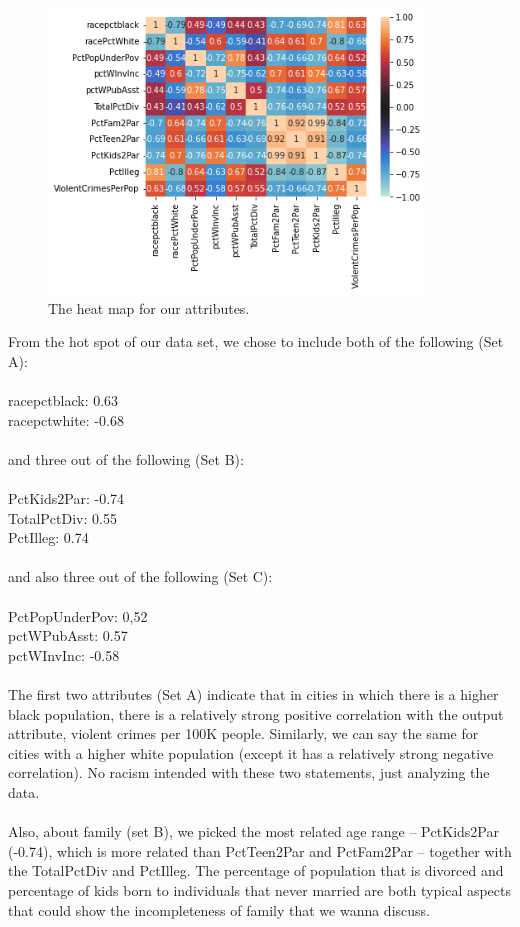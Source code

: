 \documentclass[letterpaper, 11 pt, conference]{article}
\begin{document}
\begin{figure}[H]
\centering
\includegraphics[width=10cm]{hotbox.png}
\caption{The heat map for our attributes.}
\label{fig:hotbo}
\end{figure}
From the hot spot of our data set, we chose to include both of the following (Set A):
\\
\\racepctblack: 0.63
\\racepctwhite: -0.68
\\
\\and three out of the following (Set B):
\\
\\PctKids2Par: -0.74
\\TotalPctDiv: 0.55
\\PctIlleg: 0.74
\\
\\and also three out of the following (Set C):
\\
\\PctPopUnderPov: 0,52
\\pctWPubAsst: 0.57
\\pctWInvInc: -0.58
\\
\\The first two attributes (Set A) indicate that in cities in which there is a higher black population, there is a relatively strong positive correlation with the output attribute, violent crimes per 100K people. Similarly, we can say the same for cities with a higher white population (except it has a relatively strong negative correlation). No racism intended with these two statements, just analyzing the data. 
\\
\\Also, about family (set B), we picked the most related age range -- PctKids2Par (-0.74), which is more related than PctTeen2Par and PctFam2Par -- together with the TotalPctDiv and PctIlleg. The percentage of population that is divorced and percentage of kids born to individuals that never married are both typical aspects that could show the incompleteness of family that we wanna discuss. 
\end{document}

